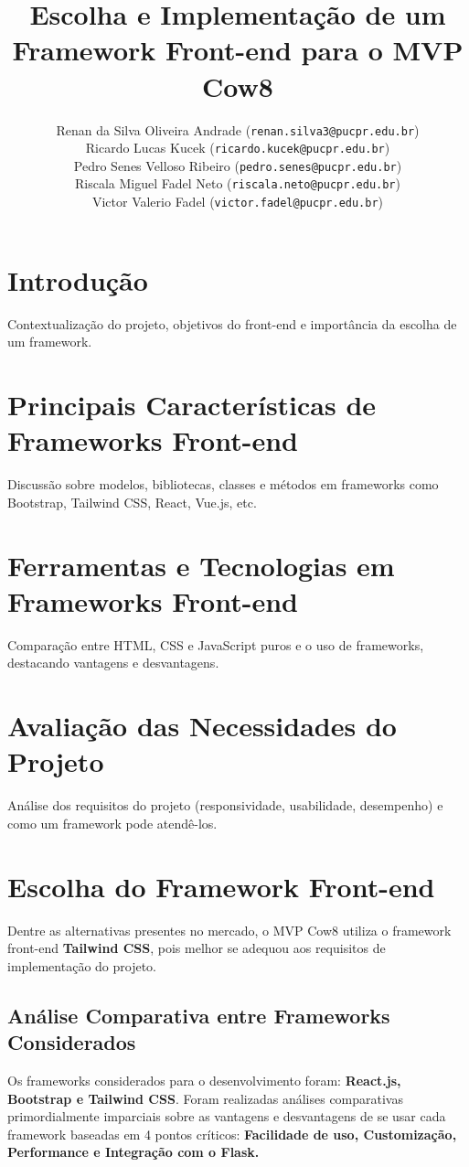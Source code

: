 \documentclass[11pt]{article}
\title{\textbf{Escolha e Implementação de um Framework Front-end para o MVP Cow8}}
\author{
    Renan da Silva Oliveira Andrade (\texttt{renan.silva3@pucpr.edu.br})\\
    Ricardo Lucas Kucek (\texttt{ricardo.kucek@pucpr.edu.br})\\
    Pedro Senes Velloso Ribeiro (\texttt{pedro.senes@pucpr.edu.br})\\
    Riscala Miguel Fadel Neto (\texttt{riscala.neto@pucpr.edu.br})\\
    Victor Valerio Fadel (\texttt{victor.fadel@pucpr.edu.br})
}
\begin{document}
\maketitle

\section{Introdução}

Contextualização do projeto, objetivos do front-end e importância da escolha de um framework.

\section{Principais Características de Frameworks Front-end}

Discussão sobre modelos, bibliotecas, classes e métodos em frameworks como Bootstrap, Tailwind CSS, React, Vue.js, etc.

\section{Ferramentas e Tecnologias em Frameworks Front-end}

Comparação entre HTML, CSS e JavaScript puros e o uso de frameworks, destacando vantagens e desvantagens.

\section{Avaliação das Necessidades do Projeto}

Análise dos requisitos do projeto (responsividade, usabilidade, desempenho) e como um framework pode atendê-los.

\section{Escolha do Framework Front-end}

Dentre as alternativas presentes no mercado, o MVP Cow8 utiliza o framework front-end \textbf{Tailwind CSS}, pois melhor se adequou aos requisitos de implementação do projeto.

\subsection{Análise Comparativa entre Frameworks Considerados}

Os frameworks considerados para o desenvolvimento foram: \textbf{React.js, Bootstrap e Tailwind CSS}. Foram realizadas análises comparativas primordialmente imparciais sobre as vantagens e desvantagens de se usar cada framework baseadas em 4 pontos críticos: \textbf{Facilidade de uso, Customização, Performance e Integração com o Flask.}
\end{document}
